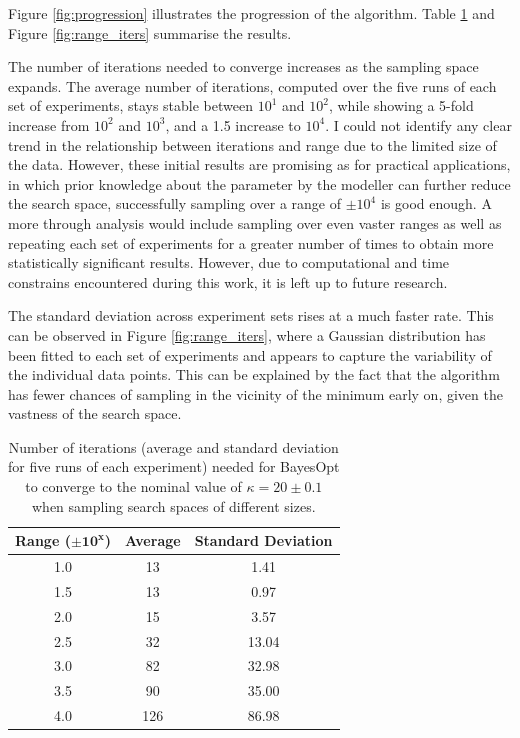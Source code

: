 \documentclass[bsc,frontabs,singlespacing,parskip,deptreport]{infthesis}
\begin{document}
Figure \ref{fig:progression} illustrates the progression of the algorithm. Table \ref{tab:range_table} and Figure \ref{fig:range_iters} summarise the results.

The number of iterations needed to converge increases as the sampling space expands. The average number of iterations, computed over the five runs of each set of experiments, stays stable between $10^{1}$ and $10^{2}$, while showing a 5-fold increase from $10^{2}$ and $10^{3}$, and a 1.5 increase to $10^{4}$. I could not identify any clear trend in the relationship between iterations and range due to the limited size of the data. However, these initial results are promising as for practical applications, in which prior knowledge about the parameter by the modeller can further reduce the search space, successfully sampling over a range of $\pm 10^{4}$ is good enough. A more through analysis would include sampling over even vaster ranges as well as repeating each set of experiments for a greater number of times to obtain more statistically significant results. However, due to computational and time constrains encountered during this work, it is left up to future research. 

The standard deviation across experiment sets rises at a much faster rate. This can be observed in Figure \ref{fig:range_iters}, where a Gaussian distribution has been fitted to each set of experiments and appears to capture the variability of the individual data points. This can be explained by the fact that the algorithm has fewer chances of sampling in the vicinity of the minimum early on, given the vastness of the search space.

\begin{table}[h]
    \centering
    \begin{tabular}{ccc} \toprule
        \textbf{Range} ($\mathbf{\pm 10^{x}}$) & \textbf{Average} & \textbf{Standard Deviation} \\ \hline
        1.0 & 13 & 1.41 \\
        1.5 & 13 & 0.97 \\
        2.0 & 15 & 3.57 \\
        2.5 & 32 & 13.04 \\
        3.0 & 82 & 32.98 \\
        3.5 & 90 & 35.00 \\
        4.0 & 126 & 86.98 \\
    \end{tabular}
    \caption{Number of iterations (average and standard deviation for five runs of each experiment) needed for BayesOpt to converge to the nominal value of $\kappa = 20 \pm 0.1$ when sampling search spaces of different sizes.}
    \label{tab:range_table}
\end{table}
\end{document}
